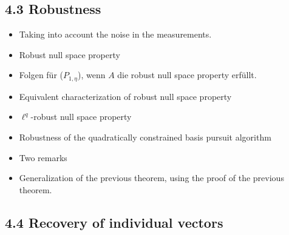\documentclass[a4paper]{article}
\begin{document}

\subsection{4.3 Robustness}

\begin{itemize}
    \item Taking into account the noise in the measurements.
    \item \begin{Def}
    {Robust null space property}{}
    \end{Def}
    \item \begin{Satz}
        {}{}
        Folgen für (\(P_{1,\eta}\)), wenn \(A \) die robust null space property erfüllt.
    \end{Satz}
    \item \begin{Satz}
        {Equivalent characterization of robust null space property}{}
    \end{Satz}
    \item \begin{Def}
    {\(\ell^q\)-robust null space property}{}
    \end{Def}
    \item \begin{Satz}
        {Robustness of the quadratically constrained basis pursuit algorithm}{}
    \end{Satz}
    \item Two remarks
    \item \begin{Satz}
    {}{}Generalization of the previous theorem, using the proof of the previous theorem.
    \end{Satz}
\end{itemize}

\subsection{4.4 Recovery of individual vectors}
    
 
\end{document}

